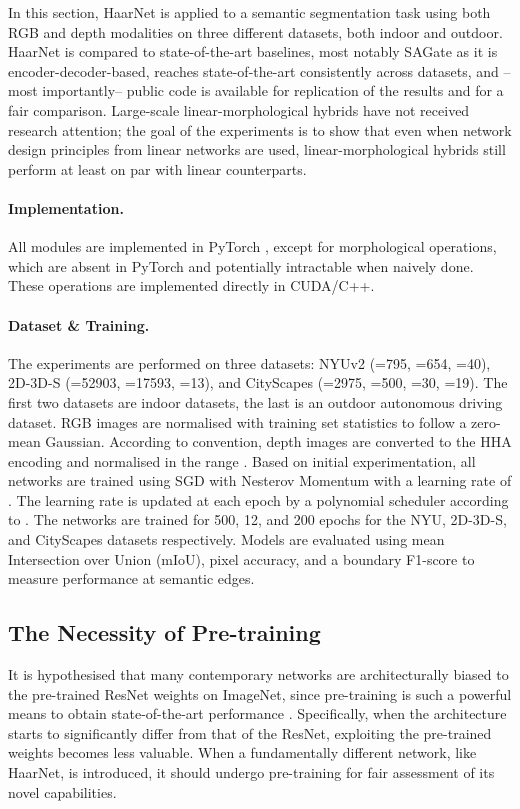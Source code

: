 \documentclass{article}
\newcommand{\myparagraph}[1]{\paragraph{\textbf{\textup{#1.}}}}
\begin{document}
In this section, HaarNet is applied to a semantic segmentation task using both RGB and depth modalities on three different datasets, both indoor and outdoor.
HaarNet is compared to state-of-the-art baselines, most notably SAGate \cite{chen2020bi} as it is encoder-decoder-based, reaches state-of-the-art consistently across datasets, and --most importantly-- public code is available for replication of the results and for a fair comparison.
Large-scale linear-morphological hybrids have not received research attention; the goal of the experiments is to show that even when network design principles from linear networks are used, linear-morphological hybrids still perform at least on par with linear counterparts.

\myparagraph{Implementation}
All modules are implemented in PyTorch \cite{paszke2019pytorch}, except for morphological operations, which are absent in PyTorch and potentially intractable when naively done. 
These operations are implemented directly in CUDA/C++.

\myparagraph{Dataset \& Training}
The experiments are performed on three datasets: NYUv2 (=795, =654, =40), 2D-3D-S (=52903, =17593, =13), and CityScapes (=2975, =500, =30, =19).
The first two datasets are indoor datasets, the last is an outdoor autonomous driving dataset.
RGB images are normalised with training set statistics to follow a zero-mean Gaussian.
According to convention, depth images are converted to the HHA encoding \cite{gupta2014learning} and normalised in the range .
Based on initial experimentation, all networks are trained using SGD with Nesterov Momentum \cite{sutskever2013importance} with a learning rate  of .
The learning rate is updated at each epoch by a polynomial scheduler according to .
The networks are trained for 500, 12, and 200 epochs for the NYU, 2D-3D-S, and CityScapes datasets respectively.
Models are evaluated using mean Intersection over Union (mIoU), pixel accuracy, and a boundary F1-score \cite{csurka2004good} to measure performance at semantic edges.

\subsection{The Necessity of Pre-training} \label{sec:experiments:pre-training}
It is hypothesised that many contemporary networks are architecturally biased to the pre-trained ResNet weights on ImageNet, since pre-training is such a powerful means to obtain state-of-the-art performance \cite{yosinski2014transferable}.
Specifically, when the architecture starts to significantly differ from that of the ResNet, exploiting the pre-trained weights becomes less valuable.
When a fundamentally different network, like HaarNet, is introduced, it should undergo pre-training for fair assessment of its novel capabilities.
\end{document}
